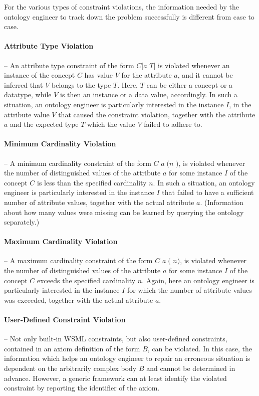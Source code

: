 For the various types of constraint violations, the information
needed by the ontology engineer to track down the problem
successfully is different from case to case.

\paragraph{Attribute Type Violation} -- An attribute type
constraint of the form $C[a$  $T]$ is violated
whenever an instance of the concept $C$ has value $V$ for the
attribute $a$, and it cannot be inferred that $V$ belongs to the
type $T$. Here, $T$ can be either a concept or a datatype, while
$V$ is then an instance or a data value, accordingly. In such a
situation, an ontology engineer is particularly interested in the
instance $I$, in the attribute value $V$ that caused the
constraint violation, together with the attribute $a$ and the
expected type $T$ which the value $V$ failed to adhere to.

\paragraph{Minimum Cardinality Violation} -- A minimum
cardinality constraint of the form  $C$ $a \; (n$
\wsml{*}$)$, is violated whenever the number of distinguished
values of the attribute $a$ for some instance $I$ of the concept
$C$ is less than the specified cardinality $n$. In such a
situation, an ontology engineer is particularly interested in the
instance $I$ that failed to have a sufficient number of attribute
values, together with the actual attribute $a$. (Information about
how many values were missing can be learned by querying the
ontology separately.)

\paragraph{Maximum Cardinality Violation} -- A maximum
cardinality constraint of the form  $C$ $a \;
($ $n)$, is violated whenever the number of distinguished
values of the attribute $a$ for some instance $I$ of the concept
$C$ exceeds the specified cardinality $n$. Again, here an ontology
engineer is particularly interested in the instance $I$ for which
the number of attribute values was exceeded, together with the
actual attribute $a$.

\paragraph{User-Defined Constraint Violation} -- Not only
built-in WSML constraints, but also user-defined constraints,
contained in an axiom definition of the form  \axiomid
{} $B$, can be violated. In this case, the
information which helps an ontology engineer to repair an
erroneous situation is dependent on the arbitrarily complex body
$B$ and cannot be determined in advance. However, a generic
framework can at least identify the violated constraint by
reporting the identifier \axiomid of the axiom.

